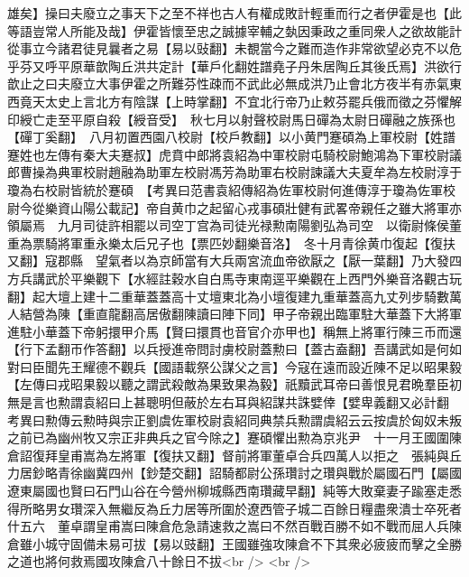 雄矣】操曰夫廢立之事天下之至不祥也古人有權成敗計輕重而行之者伊霍是也【此等語豈常人所能及哉】伊霍皆懷至忠之誠據宰輔之埶因秉政之重同衆人之欲故能計從事立今諸君徒見曩者之易【易以䜴翻】未覩當今之難而造作非常欲望必克不以危乎芬又呼平原華歆陶丘洪共定計【華戶化翻姓譜堯子丹朱居陶丘其後氏焉】洪欲行歆止之曰夫廢立大事伊霍之所難芬性疎而不武此必無成洪乃止會北方夜半有赤氣東西竟天太史上言北方有陰謀【上時掌翻】不宜北行帝乃止敕芬罷兵俄而徵之芬懼解印綬亡走至平原自殺【綬音受】　秋七月以射聲校尉馬日磾為太尉日磾融之族孫也【磾丁奚翻】　八月初置西園八校尉【校戶教翻】以小黄門蹇碩為上軍校尉【姓譜蹇姓也左傳有秦大夫蹇叔】虎賁中郎將袁紹為中軍校尉屯騎校尉鮑鴻為下軍校尉議郎曹操為典軍校尉趙融為助軍左校尉馮芳為助軍右校尉諫議大夫夏牟為左校尉淳于瓊為右校尉皆統於蹇碩　【考異曰范書袁紹傳紹為佐軍校尉何進傳淳于瓊為佐軍校尉今從樂資山陽公載記】帝自黄巾之起留心戎事碩壯健有武畧帝親任之雖大將軍亦領屬焉　九月司徒許相罷以司空丁宫為司徒光禄勲南陽劉弘為司空　以衛尉條侯董重為票騎將軍重永樂太后兄子也【票匹妙翻樂音洛】　冬十月青徐黄巾復起【復扶又翻】寇郡縣　望氣者以為京師當有大兵兩宮流血帝欲厭之【厭一葉翻】乃大發四方兵講武於平樂觀下【水經註穀水自白馬寺東南逕平樂觀在上西門外樂音洛觀古玩翻】起大壇上建十二重華蓋蓋高十丈壇東北為小壇復建九重華蓋高九丈列步騎數萬人結營為陳【重直龍翻高居傲翻陳讀曰陣下同】甲子帝親出臨軍駐大華蓋下大將軍進駐小華蓋下帝躬擐甲介馬【賢曰擐貫也音官介亦甲也】稱無上將軍行陳三币而還【行下孟翻帀作答翻】以兵授進帝問討虜校尉蓋勲曰【蓋古盍翻】吾講武如是何如對曰臣聞先王耀德不觀兵【國語載祭公謀父之言】今寇在遠而設近陳不足以昭果毅【左傳曰戎昭果毅以聽之謂武殺敵為果致果為毅】祇黷武耳帝曰善恨見君晩羣臣初無是言也勲謂袁紹曰上甚聰明但蔽於左右耳與紹謀共誅嬖倖【嬖卑義翻又必計翻　考異曰勲傳云勲時與宗正劉虞佐軍校尉袁紹同典禁兵勲謂虞紹云云按虞於匈奴未叛之前已為幽州牧又宗正非典兵之官今除之】蹇碩懼出勲為京兆尹　十一月王國圍陳倉詔復拜皇甫嵩為左將軍【復扶又翻】督前將軍董卓合兵四萬人以拒之　張純與丘力居鈔略青徐幽冀四州【鈔楚交翻】詔騎都尉公孫瓚討之瓚與戰於屬國石門【屬國遼東屬國也賢曰石門山谷在今營州柳城縣西南瓚藏早翻】純等大敗棄妻子踰塞走悉得所略男女瓚深入無繼反為丘力居等所圍於遼西管子城二百餘日糧盡衆潰士卒死者什五六　董卓謂皇甫嵩曰陳倉危急請速救之嵩曰不然百戰百勝不如不戰而屈人兵陳倉雖小城守固備未易可拔【易以豉翻】王國雖強攻陳倉不下其衆必疲疲而擊之全勝之道也將何救焉國攻陳倉八十餘日不拔<br />
<br />
